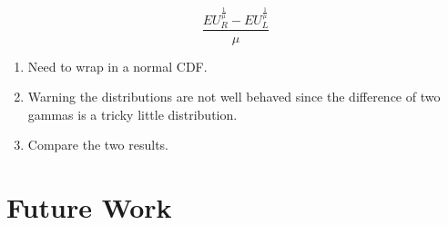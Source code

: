 \documentclass{article}
\begin{document}
  
  
\begin{equation}
\frac{EU_R^{\frac{1}{\mu}}-EU_L^{\frac{1}{\mu}}}{\mu}
\end{equation}


    \begin{enumerate}
      \item  Need to wrap in a normal CDF.
      \item Warning the distributions are not well behaved since the difference of two gammas is a tricky little distribution.
      \item Compare the two results.
    \end{enumerate}


\section{Future Work}




\nocite{*}


\end{document}
